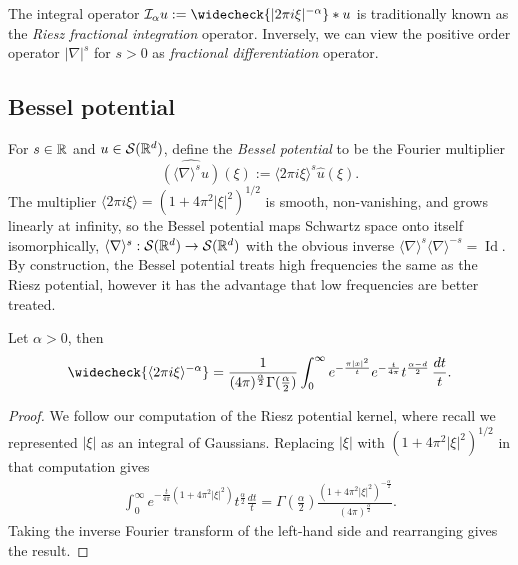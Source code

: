 \begin{remark}
	The integral operator $\mathcal I_\alpha u := \widecheck{|2\pi i \xi|^{-\alpha}} * u$ is traditionally known as the \textit{Riesz fractional integration} operator. Inversely, we can view the positive order operator $|\nabla|^s$ for $s > 0$ as \textit{fractional differentiation} operator. 
\end{remark}



\subsection{Bessel potential}

For $s \in \mathbb R$ and $u \in \mathcal S (\mathbb R^d)$, define the \emph{Bessel potential} to be the Fourier multiplier
	\[ \widehat{(\langle \nabla \rangle^s u)} (\xi) := \langle 2\pi i \xi \rangle^s \widehat u (\xi).  \]
The multiplier $\langle 2\pi i \xi \rangle = (1 + 4\pi^2 |\xi|^2)^{1/2}$ is smooth, non-vanishing, and grows linearly at infinity, so the Bessel potential maps Schwartz space onto itself isomorphically, $\langle \nabla \rangle^s : \mathcal S (\mathbb R^d) \to \mathcal S (\mathbb R^d)$ with the obvious inverse $\langle \nabla \rangle^s \langle \nabla \rangle^{-s} = \operatorname{Id}$. By construction, the Bessel potential treats high frequencies the same as the Riesz potential, however it has the advantage that low frequencies are better treated. 

\begin{proposition}
	Let $\alpha > 0$, then 
		\[\widecheck{\langle 2\pi i \xi \rangle^{-\alpha}}  = \frac{1}{(4\pi)^{\frac\alpha2} \Gamma(\frac\alpha2)} \int_0^\infty  e^{- \frac{\pi |x|^2}{t}} e^{-\frac{t}{4\pi}}  t^{\frac{\alpha - d}{2}} \, \frac{dt}{t}. \]
\end{proposition}

\begin{proof}
	We follow our computation of the Riesz potential kernel, where recall we represented $|\xi|$ as an integral of Gaussians. Replacing $|\xi|$ with $(1 + 4\pi^2 |\xi|^2)^{1/2}$ in that computation gives
		\begin{align*}
			 \int_0^\infty e^{-\frac{t}{4\pi} (1 + 4\pi^2 |\xi|^2)} t^{\frac\alpha2} \frac{dt}{t} = \Gamma\left(\frac\alpha2\right)\frac{(1 + 4\pi^2 |\xi|^2)^{-\frac\alpha2} }{(4\pi)^{\frac\alpha2}} . 
		\end{align*}
	Taking the inverse Fourier transform of the left-hand side and rearranging gives the result. 
\end{proof}

